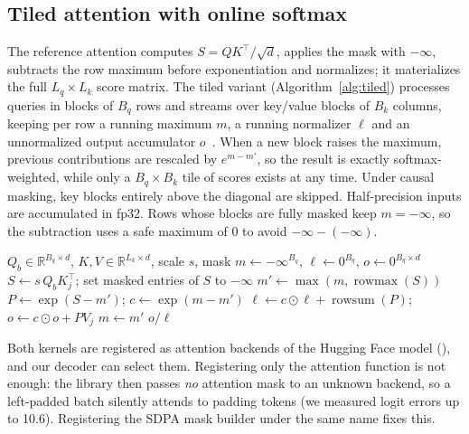 \subsection{Tiled attention with online softmax}
\label{sec:tiled}
The reference attention computes $S = QK^\top/\sqrt{d}$, applies the mask with $-\infty$, subtracts
the row maximum before exponentiation and normalizes; it materializes the full $L_q\times L_k$ score
matrix. The tiled variant (Algorithm~\ref{alg:tiled}) processes queries in blocks of $B_q$ rows and
streams over key/value blocks of $B_k$ columns, keeping per row a running maximum $m$, a running
normalizer $\ell$ and an unnormalized output accumulator $o$~\cite{milakov2018online,dao2022flashattention}.
When a new block raises the maximum, previous contributions are rescaled by $e^{m-m'}$, so the result
is exactly softmax-weighted, while only a $B_q\times B_k$ tile of scores exists at any time. Under
causal masking, key blocks entirely above the diagonal are skipped. Half-precision inputs are
accumulated in fp32. Rows whose blocks are fully masked keep $m=-\infty$, so the subtraction uses a
safe maximum of 0 to avoid $-\infty-(-\infty)$.

\begin{algorithm}[t]
\caption{Tiled attention with online softmax (one query block)}
\label{alg:tiled}
\begin{algorithmic}[1]
\Require $Q_b\in\mathbb{R}^{B_q\times d}$, $K, V\in\mathbb{R}^{L_k\times d}$, scale $s$, mask
\State $m \gets -\infty^{B_q}$, $\ell \gets 0^{B_q}$, $o \gets 0^{B_q\times d}$
  \State $S \gets s\,Q_b K_j^\top$; set masked entries of $S$ to $-\infty$
  \State $m' \gets \max(m, \operatorname{rowmax}(S))$
  \State $P \gets \exp(S - m')$; \quad $c \gets \exp(m - m')$
  \State $\ell \gets c\odot\ell + \operatorname{rowsum}(P)$; \quad $o \gets c\odot o + P V_j$
  \State $m \gets m'$
\EndFor
\State \Return $o / \ell$
\end{algorithmic}
\end{algorithm}

Both kernels are registered as attention backends of the Hugging Face model
(), and our decoder can select them. Registering only the attention
function is not enough: the library then passes \emph{no} attention mask to an unknown backend, so a
left-padded batch silently attends to padding tokens (we measured logit errors up to 10.6). Registering
the SDPA mask builder under the same name fixes this.

